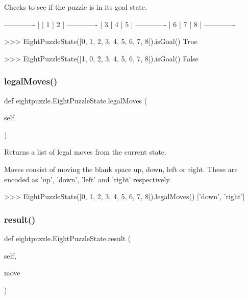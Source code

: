 \begin{DoxyVerb}  Checks to see if the puzzle is in its goal state.

 -------------
 |   | 1 | 2 |
 -------------
 | 3 | 4 | 5 |
 -------------
 | 6 | 7 | 8 |
 -------------

>>> EightPuzzleState([0, 1, 2, 3, 4, 5, 6, 7, 8]).isGoal()
True

>>> EightPuzzleState([1, 0, 2, 3, 4, 5, 6, 7, 8]).isGoal()
False
\end{DoxyVerb}
 \mbox{\label{classeightpuzzle_1_1_eight_puzzle_state_a84b1f014353df672abaa38767b775728}} 
\subsubsection{\texorpdfstring{legal\+Moves()}{legalMoves()}}
{\footnotesize\ttfamily def eightpuzzle.\+Eight\+Puzzle\+State.\+legal\+Moves (\begin{DoxyParamCaption}\item[{}]{self }\end{DoxyParamCaption})}

\begin{DoxyVerb}  Returns a list of legal moves from the current state.

Moves consist of moving the blank space up, down, left or right.
These are encoded as 'up', 'down', 'left' and 'right' respectively.

>>> EightPuzzleState([0, 1, 2, 3, 4, 5, 6, 7, 8]).legalMoves()
['down', 'right']
\end{DoxyVerb}
 \mbox{\label{classeightpuzzle_1_1_eight_puzzle_state_a00709c78e645608fffc3fd44d9941519}} 
\subsubsection{\texorpdfstring{result()}{result()}}
{\footnotesize\ttfamily def eightpuzzle.\+Eight\+Puzzle\+State.\+result (\begin{DoxyParamCaption}\item[{}]{self,  }\item[{}]{move }\end{DoxyParamCaption})}


